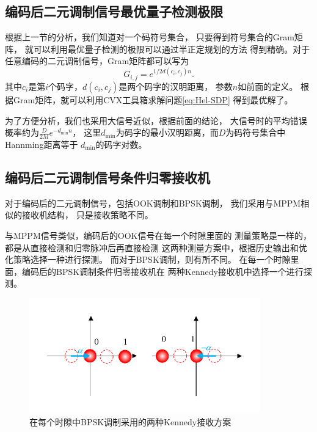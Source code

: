 \subsection{编码后二元调制信号最优量子检测极限}
根据上一节的分析，我们知道对一个码符号集合，
只要得到符号集合的Gram矩阵，
就可以利用最优量子检测的极限可以通过半正定规划的方法
得到精确。对于任意编码的二元调制信号，Gram矩阵都可以写为
\begin{equation}
G_{i,j} = e^{1/2 d(c_i, c_j) n}.
\end{equation}
其中$c_i$是第$i$个码字，$d(c_i, c_j)$是两个码字的汉明距离，
参数$n$如前面的定义。
根据Gram矩阵，就可以利用CVX工具箱\cite{cvx,gb08}求解问题\ref{eq:Hel-SDP}
得到最优解了。

为了方便分析，我们也采用大信号近似，根据前面的结论，
大信号时的平均错误概率约为$ \frac{D}{2M} e^{-d_{\min} n}$，
这里$d_{\min}$为码字的最小汉明距离，而$D$为码符号集合中Hannming距离等于
$d_{\min}$的码字对数。





\subsection{编码后二元调制信号条件归零接收机}
对于编码后的二元调制信号，包括OOK调制和BPSK调制，
我们采用与MPPM相似的接收机结构，
只是接收策略不同。

与MPPM信号类似，编码后的OOK信号在每一个时隙里面的
测量策略是一样的，都是从直接检测和归零脉冲后再直接检测
这两种测量方案中，根据历史输出和优化策略选择一种进行探测。
而对于BPSK调制，则有所不同。
在每一个时隙里面，编码后的BPSK调制条件归零接收机在
两种Kennedy接收机中选择一个进行探测。


\begin{figure}
\centering
  \includegraphics[height=5cm]{figures/chap4/BSPK-AB-receiver}
  \caption{在每个时隙中BPSK调制采用的两种Kennedy接收方案}
  \label{fig:BSPK-AB-receiver}
\end{figure}





